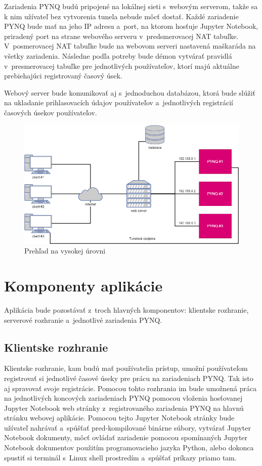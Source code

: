 Zariadenia PYNQ budú pripojené na lokálnej sieti s~webovým serverom, takže sa k nim užívateľ bez vytvorenia tunela nebude môcť dostať. Každé zariadenie PYNQ bude mať na jeho IP adresu a~port, na ktorom hosťuje Jupyter Notebook, priradený port na strane webového serveru v~predsmerovacej NAT tabuľke. V~posmerovacej NAT tabuľke bude na webovom serveri nastavená maškaráda na všetky zariadenia. Následne podľa potreby bude démon vytvárať pravidlá v~presmerovacej tabuľke pre jednotlivých používateľov, ktorí majú aktuálne prebiehajúci registrovaný časový úsek.

Webový server bude komunikovať aj s~jednoduchou databázou, ktorá bude slúžiť na ukladanie prihlasovacích údajov používateľov a~jednotlivých registrácií časových úsekov používateľov.

\begin{figure}[t] \label{high-level overview}
    \centering
    \includegraphics[width=1\linewidth]{obrazky-figures/High_Level_diagram.png}
    \caption{Prehľad na vysokej úrovni}
\end{figure}

\section{Komponenty aplikácie}

Aplikácia bude pozostávať z~troch hlavných komponentov: klientske rozhranie, serverové rozhranie a~jednotlivé zariadenia PYNQ.

\subsection{Klientske rozhranie}

Klientske rozhranie, kam budú mať používatelia prístup, umožní používateľom registrovať si jednotlivé časové úseky pre prácu na zariadeniach PYNQ. Tak isto aj spravovať svoje registrácie. Pomocou tohto rozhrania im bude umožnená práca na jednotlivých koncových zariadeniach PYNQ pomocou vloženia hosťovanej Jupyter Notebook web stránky z~registrovaného zariadenia PYNQ na hlavnú stránku webovej aplikácie. Pomocou tejto Jupyter Notebook stránky bude užívateľ nahrávať a~spúšťať pred-kompilované binárne súbory, vytvárať Jupyter Notebook dokumenty, môcť ovládať zariadenie pomocou spomínaných Jupyter Notebook dokumentov použitím programovacieho jazyka Python, alebo dokonca spustiť si terminál s~Linux shell prostredím a~spúšťať príkazy priamo tam.

